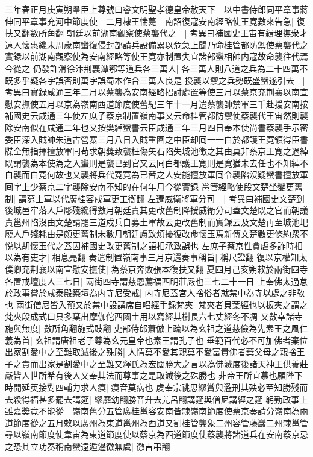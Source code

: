 三年春正月庚寅朔羣臣上尊號曰睿文明聖孝德皇帝赦天下　以中書侍郎同平章事蔣伸同平章事充河中節度使　二月棣王惴薨　南詔復寇安南經略使王寛數來告急|{
	復扶又翻數所角翻}
朝廷以前湖南觀察使蔡襲代之　|{
	考異曰補國史王宙有緝理撫衆才遠人懷惠纔未周歲南蠻復侵封部請兵設備累以危急上聞乃命桂管都防禦使蔡襲代之實録以前湖南觀察使為安南經略等使王寛亦制置失宜諸部蠻相帥内寇故命襲往代焉今從之}
仍發許滑徐汴荆襄潭鄂等道兵各三萬人|{
	各三萬人則八道之兵為二十四萬不既多乎疑各字誤否則萬字誤蜀本作合三萬人良是}
授襲以禦之兵勢既盛蠻遂引去　|{
	考異曰實録咸通三年二月以蔡襲為安南經略招討處置等使三月以蔡京充荆襄以南宣慰安撫使五月以京為嶺南西道節度使舊紀三年十一月遣蔡襲帥禁軍三千赴援安南按補國史云咸通三年使左庶子蔡京制置嶺南事又云命桂管都防禦使蔡襲代王宙然則襲除安南似在咸通二年也又按樊綽蠻書云臣咸通三年三月四日奉本使尚書蔡襲手示密委臣深入賊帥朱道古營寨三月八日入賊重圍之中臣却囘一一白於都護王寛領得臣書牒全無指揮擅放軍囘苟求朝奬致襲枉傷矢石陷失城池徵之其由莫非蔡京王寛之過綽既謂襲為本使為之入蠻則是襲已到官又云囘白都護王寛則是寛猶未去任也不知綽不白襲而白寛何故也又襲將兵代寛寛為已替之人安能擅放軍囘令襲陷沒疑蠻書擅放軍囘字上少蔡京二字襲除安南不知的在何年月今從實録}
邕管經略使段文楚坐變更舊制|{
	謂募土軍以代廣桂容戍軍更工衡翻}
左遷威衛將軍分司　|{
	考異曰補國史文楚到後城邑牢落人戶彫殘纔得數月朝廷責其更改舊制降授威衛分司蓋文楚既之官而朝議責邕州陷沒由文楚請罷三道戍兵自募土軍故云更改舊制而實録云及文楚再至城池圯廢人戶殘耗由是頗更舊制未數月朝廷慮致煩擾復改命懷玉焉新傳文楚數更條約衆不悦以胡懷玉代之蓋因補國史改更舊制之語相承致誤也}
左庶子蔡京性貪虐多詐時相以為有吏才|{
	相息亮翻}
奏遣制置嶺南事三月京還奏事稱旨|{
	稱尺證翻}
復以京權知太僕卿充荆襄以南宣慰安撫使|{
	為蔡京奔敗張本復扶又翻}
夏四月己亥朔敕於兩街四寺各置戒壇度人三七日|{
	兩街四寺謂慈恩薦福西明莊嚴也三七二十一日}
上奉佛太過怠於政事嘗於咸泰殿築壇為内寺尼受戒|{
	内寺尼蓋宮人捨俗者就禁中為寺以處之非敎也}
兩街僧尼皆入預又於禁中設講席自唱經手録梵夾|{
	梵夾者貝葉經也以板夾之謂之梵夾段成式曰貝多葉出摩伽佗西國土用以寫經其樹長六七丈經冬不凋}
又數幸諸寺施與無度|{
	數所角翻施式豉翻}
吏部侍郎蕭倣上疏以為玄祖之道慈儉為先素王之風仁義為首|{
	玄祖謂唐祖老子尊為玄元皇帝也素王謂孔子也}
垂範百代必不可加佛者棄位出家割愛中之至難取滅後之殊勝|{
	人情莫不愛其親莫不愛富貴佛者棄父母之親捨王子之貴而出家是割愛中之至難又釋氏為宏闊勝大之言以為佛滅度後諸天神王供養莊嚴皆人世所希有後人又奉其法而尊事之是取滅後之殊勝也}
非帝王所宜慕也願陛下時開延英接對四輔力求人瘼|{
	瘼音莫病也}
䖍奉宗祧思繆賞與濫刑其殃必至知勝殘而去殺得福甚多罷去講筵|{
	繆靡幼翻勝音升去羌呂翻講筵與僧尼講經之筵}
躬勤政事上雖嘉奬竟不能從　嶺南舊分五管廣桂邕容安南皆隸嶺南節度使蔡京奏請分嶺南為兩道節度從之五月敕以廣州為東道邕州為西道又割桂管龔象二州容管藤巖二州隸邕管尋以嶺南節度使韋宙為東道節度使以蔡京為西道節度使蔡襲將諸道兵在安南蔡京忌之恐其立功奏稱南蠻遠遁邊徼無虞|{
	徼吉弔翻}
